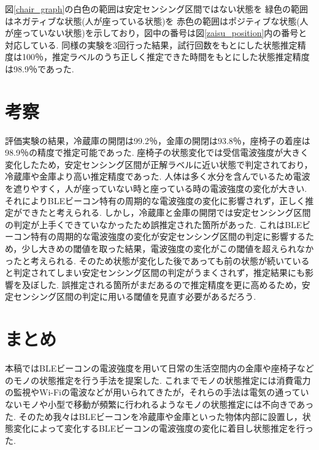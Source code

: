 \documentclass[Japanese]{dicomopapers}
\begin{document}
図\ref{chair_graph}の白色の範囲は安定センシング区間ではない状態を 緑色の範囲はネガティブな状態(人が座っている状態)を 赤色の範囲はポジティブな状態(人が座っていない状態)を示しており，図中の番号は図\ref{zaisu_position}内の番号と対応している.
同様の実験を3回行った結果，試行回数をもとにした状態推定精度は100％，推定ラベルのうち正しく推定できた時間をもとにした状態推定精度は98.9％であった.


\section{考察}
評価実験の結果，冷蔵庫の開閉は99.2％，金庫の開閉は93.8％，座椅子の着座は98.9％の精度で推定可能であった.
座椅子の状態変化では受信電波強度が大きく変化したため，安定センシング区間が正解ラベルに近い状態で判定されており，冷蔵庫や金庫より高い推定精度であった.
人体は多く水分を含んでいるため電波を遮りやすく，人が座っていない時と座っている時の電波強度の変化が大きい.
それによりBLEビーコン特有の周期的な電波強度の変化に影響されず，正しく推定ができたと考えられる.
しかし，冷蔵庫と金庫の開閉では安定センシング区間の判定が上手くできていなかったため誤推定された箇所があった.
これはBLEビーコン特有の周期的な電波強度の変化が安定センシング区間の判定に影響するため，少し大きめの閾値を取った結果，電波強度の変化がこの閾値を超えられなかったと考えられる.
そのため状態が変化した後であっても前の状態が続いていると判定されてしまい安定センシング区間の判定がうまくされず，推定結果にも影響を及ぼした.
誤推定される箇所がまだあるので推定精度を更に高めるため，安定センシング区間の判定に用いる閾値を見直す必要があるだろう.



\section{まとめ}
本稿ではBLEビーコンの電波強度を用いて日常の生活空間内の金庫や座椅子などのモノの状態推定を行う手法を提案した.
これまでモノの状態推定には消費電力の監視やWi-Fiの電波などが用いられてきたが，それらの手法は電気の通っていないモノや小型で移動が頻繁に行われるようなモノの状態推定には不向きであった.
そのため我々はBLEビーコンを冷蔵庫や金庫といった物体内部に設置し，状態変化によって変化するBLEビーコンの電波強度の変化に着目し状態推定を行った.
\end{document}
